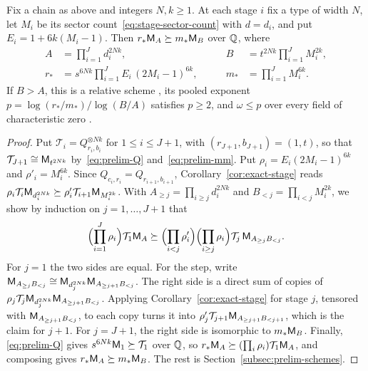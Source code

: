 \begin{proposition}\label{prop:chain-counts}
Fix a chain as above and integers \(N,k\ge1\). At each stage \(i\) fix a
type of width \(N\), let \(M_i\) be its sector
count~\eqref{eq:stage-sector-count} with \(d=d_i\), and put
\(E_i=1+6k(M_i-1)\). Then \(r_*\mathsf M_A\succeq m_*\mathsf M_B\) over \(\mathbb Q\), where
\begin{equation}\label{eq:stage-chain-counts}
\begin{aligned}
 A&=\prod_{i=1}^Jd_i^{2Nk},&\qquad
 B&=t^{2Nk}\prod_{i=1}^JM_i^{2k},\\
 r_*&=s^{6Nk}\prod_{i=1}^JE_i\,(2M_i-1)^{6k},&\qquad
 m_*&=\prod_{i=1}^JM_i^{6k}.
\end{aligned}
\end{equation}
If \(B>A\), this is a relative scheme \citep[Definition~2.3]{FinCon26}, its
pooled exponent \(p=\log(r_*/m_*)/\log(B/A)\) satisfies \(p\ge2\), and
\(\omega\le p\) over every field of characteristic zero
\citep[Lemma~2.4]{FinCon26}.
\end{proposition}

\begin{proof}
Put \(\mathcal T_i=Q_{r_i,b_i}^{\otimes Nk}\) for \(1\le i\le J+1\), with
\((r_{J+1},b_{J+1})=(1,t)\), so that \(\mathcal T_{J+1}\cong\mathsf M_{t^{2Nk}}\)
by~\eqref{eq:prelim-Q} and~\eqref{eq:prelim-mm}. Put
\(\rho_i=E_i(2M_i-1)^{6k}\) and \(\rho'_i=M_i^{6k}\). Since
\(Q_{c_i,r_i}=Q_{r_{i+1},b_{i+1}}\), Corollary~\ref{cor:exact-stage} reads
\(\rho_i\mathcal T_i\mathsf M_{d_i^{2Nk}}\succeq\rho'_i\mathcal T_{i+1}\mathsf M_{M_i^{2k}}\). With
\(A_{\ge j}=\prod_{i\ge j}d_i^{2Nk}\) and \(B_{<j}=\prod_{i<j}M_i^{2k}\),
we show by induction on \(j=1,\ldots,J+1\) that
\[
 \Bigl(\prod_{i=1}^J\rho_i\Bigr)\mathcal T_1\mathsf M_A\succeq
 \Bigl(\prod_{i<j}\rho'_i\Bigr)\Bigl(\prod_{i\ge j}\rho_i\Bigr)
 \mathcal T_j\,\mathsf M_{A_{\ge j}B_{<j}} .
\]
For \(j=1\) the two sides are equal. For the step, write
\(\mathsf M_{A_{\ge j}B_{<j}}\cong\mathsf M_{d_j^{2Nk}}\mathsf M_{A_{\ge j+1}B_{<j}}\). The
right side is a direct sum of copies of
\(\rho_j\mathcal T_j\mathsf M_{d_j^{2Nk}}\mathsf M_{A_{\ge j+1}B_{<j}}\). Applying
Corollary~\ref{cor:exact-stage} for stage \(j\), tensored with
\(\mathsf M_{A_{\ge j+1}B_{<j}}\), to each copy turns it into
\(\rho'_j\mathcal T_{j+1}\mathsf M_{A_{\ge j+1}B_{<j+1}}\), which is the claim for
\(j+1\). For \(j=J+1\), the right side is isomorphic to \(m_*\mathsf M_B\).
Finally, \eqref{eq:prelim-Q} gives \(s^{6Nk}\mathsf M_1\succeq \mathcal T_1\) over \(\mathbb Q\),
so \(r_*\mathsf M_A\succeq(\prod_i\rho_i)\mathcal T_1\mathsf M_A\), and composing gives
\(r_*\mathsf M_A\succeq m_*\mathsf M_B\). The rest is
Section~\ref{subsec:prelim-schemes}.
\end{proof}


